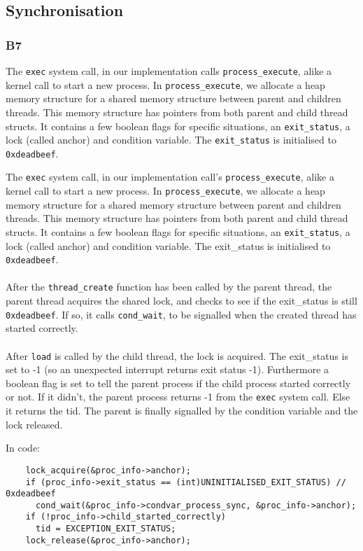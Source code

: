 \documentclass[a4wide, 11pt]{article}
\newcommand{\tx}{\texttt}
\begin{document}
\subsection{Synchronisation}
\subsubsection{B7}

The \tx{exec} system call, in our implementation calls \tx{process\_execute}, alike a kernel call to start a new process. In \tx{process\_execute}, we allocate a heap memory structure for a shared memory structure between parent and children threads. This memory structure has pointers from both parent and child thread structs. It contains a few boolean flags for specific situations, an \tx{exit\_status}, a lock (called anchor) and condition variable. The \tx{exit\_status} is initialised to \tx{0xdeadbeef}.

The \tx{exec} system call, in our implementation call's \tx{process\_execute}, alike a kernel call to start a new process. In \tx{process\_execute}, we allocate a heap memory structure for a shared memory structure between parent and children threads. This memory structure has pointers from both parent and child thread structs. It contains a few boolean flags for specific situations, an \tx{exit\_status}, a lock (called anchor) and condition variable. The exit\_status is initialised to \tx{0xdeadbeef}.
\\\\
After the \tx{thread\_create} function has been called by the parent thread, the parent thread acquires the shared lock, and checks to see if the exit\_status is still \tx{0xdeadbeef}. If so, it calls \tx{cond\_wait}, to be signalled when the created thread has started correctly.
\\\\
After \texttt{load} is called by the child thread, the lock is acquired. The exit\_status is set to -1 (so an unexpected interrupt returns exit status -1). Furthermore a boolean flag is set to tell the parent process if the child process started correctly or not. If it didn't, the parent process returns -1 from the \texttt{exec} system call. Else it returns the tid. The parent is finally signalled by the condition variable and the lock released.

In code:

\begin{verbatim}
    lock_acquire(&proc_info->anchor);
    if (proc_info->exit_status == (int)UNINITIALISED_EXIT_STATUS) // 0xdeadbeef
      cond_wait(&proc_info->condvar_process_sync, &proc_info->anchor);
    if (!proc_info->child_started_correctly)
      tid = EXCEPTION_EXIT_STATUS;
    lock_release(&proc_info->anchor);
\end{verbatim}
\end{document}
